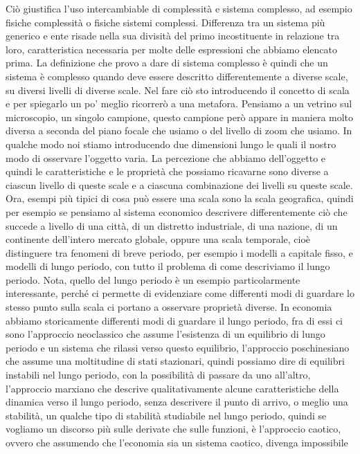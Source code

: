 \documentclass[a4paper, headings=standardclasses]{scrartcl}
\begin{document}
Ciò giustifica l'uso intercambiable di complessità e sistema complesso, ad esempio fisiche complessità
o fisiche sistemi complessi.
Differenza tra un sistema più generico e ente risade nella sua divisità del primo
incostituente in relazione tra loro, caratteristica necessaria per molte delle espressioni che
abbiamo elencato prima.
La definizione che provo a dare di sistema complesso è quindi che un sistema è complesso
quando deve essere descritto differentemente a diverse scale, su diversi livelli di diverse
scale.
Nel fare ciò sto introducendo il concetto di scala e per spiegarlo un po' meglio ricorrerò
a una metafora.
Pensiamo a un vetrino sul microscopio, un singolo campione, questo campione però appare
in maniera molto diversa a seconda del piano focale che usiamo o del livello di zoom che
usiamo.
In qualche modo noi stiamo introducendo due dimensioni lungo le quali il nostro modo di
osservare l'oggetto varia.
La percezione che abbiamo dell'oggetto e quindi le caratteristiche e le proprietà che possiamo
ricavarne sono diverse a ciascun livello di queste scale e a ciascuna combinazione dei
livelli su queste scale.
Ora, esempi più tipici di cosa può essere una scala sono la scala geografica, quindi
per esempio se pensiamo al sistema economico descrivere differentemente ciò che succede
a livello di una città, di un distretto industriale, di una nazione, di un continente dell'intero
mercato globale, oppure una scala temporale, cioè distinguere tra fenomeni di breve periodo,
per esempio i modelli a capitale fisso, e modelli di lungo periodo, con tutto il problema
di come descriviamo il lungo periodo.
Nota, quello del lungo periodo è un esempio particolarmente interessante, perché ci permette
di evidenziare come differenti modi di guardare lo stesso punto sulla scala ci portano a osservare
proprietà diverse.
In economia abbiamo storicamente differenti modi di guardare il lungo periodo, fra di
essi ci sono l'approccio neoclassico che assume l'esistenza di un equilibrio di lungo periodo
e un sistema che rilassi verso questo equilibrio, l'approccio poschinesiano che assume una moltitudine
di stati stazionari, quindi possiamo dire di equilibri instabili nel lungo periodo, con
la possibilità di passare da uno all'altro, l'approccio marxiano che descrive qualitativamente
alcune caratteristiche della dinamica verso il lungo periodo, senza descrivere il punto
di arrivo, o meglio una stabilità, un qualche tipo di stabilità studiabile nel lungo periodo,
quindi se vogliamo un discorso più sulle derivate che sulle funzioni, è l'approccio
caotico, ovvero che assumendo che l'economia sia un sistema caotico, divenga impossibile
\end{document}
